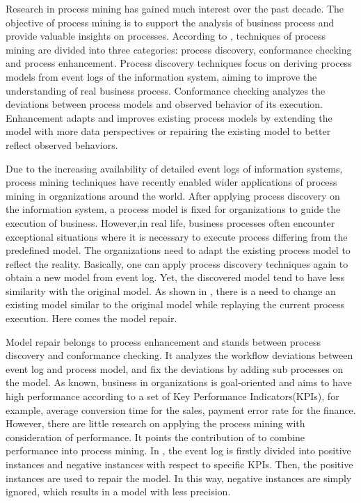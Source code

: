 %
Research in process mining has gained much interest over the past decade\cite{van2011process,ghasemi2016process}. The objective of process mining is to support the analysis of business process and provide valuable insights on processes. According to \cite{van2011process}, techniques of process mining are divided into three categories: process discovery, conformance checking and process enhancement. Process discovery techniques focus on deriving process models from event logs of the information system, aiming to improve the understanding of real business process. Conformance checking analyzes the deviations between process models and observed behavior of its execution. Enhancement adapts and improves existing process models by extending the model with more data perspectives or repairing the existing model to better reflect observed behaviors. 

Due to the increasing availability of detailed event logs of information systems, process mining techniques have recently enabled wider applications of process mining in organizations around the world\cite{van2011process}. After applying process discovery  on the information system, a process model is fixed for organizations to guide the execution of business. However,in real life, business processes often encounter exceptional situations where it is necessary to execute process differing from the predefined model. The organizations need to adapt the existing process model to reflect the reality. Basically, one can apply process discovery techniques again to obtain a new model from event log. Yet, the discovered model tend to have less similarity with the original model\cite{fahland2012repairing}. As shown in \cite{fahland2012repairing}, there is a need to change an existing model similar to the original model while replaying the current process execution. Here comes the model repair. 

Model repair belongs to process enhancement and stands between process discovery and conformance checking. It analyzes the workflow deviations between event log  and process model, and fix the deviations by adding sub processes on the model. As known, business in organizations is goal-oriented and aims to have high performance according to a set of Key Performance Indicators(KPIs), for example, average conversion time for the sales, payment error rate for the finance. However, there are little research on applying the process mining with consideration of performance\cite{ghasemi2016process}.  It points the contribution of \cite{dees2017enhancing} to combine performance into process mining. In \cite{dees2017enhancing}, the event log is firstly divided into positive instances and negative instances with respect to specific KPIs. Then, the positive instances are used to repair the model. In this way, negative instances are simply ignored, which results in a model with less precision. %


